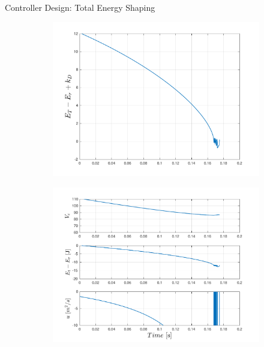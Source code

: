 \documentclass[10pt]{beamer}
\begin{document}
  \begin{frame}{Controller Design: Total Energy Shaping}
    \begin{figure}
      \caption{The controller encountered a
        singular point for initial state $(\theta(0),l(0),\dot{\theta}(0),
        \dot{l}(0)) = (-\pi/6,2,0,4)$.}
      \vspace{-0.3cm}
      \begin{subfigure}{.49\textwidth}
        \includegraphics[width=1\linewidth]{images/total_2.pdf}
      \end{subfigure}
      \begin{subfigure}{.49\textwidth}
        \includegraphics[width=1\linewidth]{images/total_1.pdf}
      \end{subfigure}  
    \end{figure}
  \end{frame}
  
\end{document}
